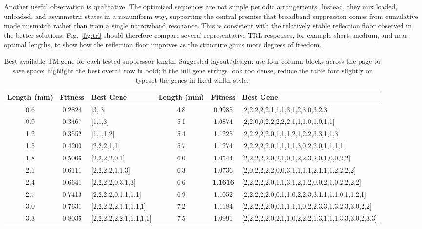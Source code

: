 \documentclass[journal]{IEEEtran}
\begin{document}
Another useful observation is qualitative. The optimized sequences are not simple periodic arrangements. Instead, they mix loaded, unloaded, and asymmetric states in a nonuniform way, supporting the central premise that broadband suppression comes from cumulative mode mismatch rather than from a single narrowband resonance. This is consistent with the relatively stable reflection floor observed in the better solutions. Fig.~\ref{fig:trl} should therefore compare several representative TRL responses, for example short, medium, and near-optimal lengths, to show how the reflection floor improves as the structure gains more degrees of freedom.

\begin{table}[t]
\centering
\caption{Best available TM gene for each tested suppressor length. Suggested layout/design: use four-column blocks across the page to save space; highlight the best overall row in bold; if the full gene strings look too dense, reduce the table font slightly or typeset the genes in fixed-width style.}
\label{tab:genes}
\begin{tabular}{c c p{2.6cm} c c p{2.6cm}}
\toprule
Length (mm) & Fitness & Best Gene & Length (mm) & Fitness & Best Gene \\
\midrule
0.6 & 0.2824 & [3, 3] & 4.8 & 0.9985 & [2,2,2,2,2,1,1,1,3,1,2,3,0,3,2,3] \\
0.9 & 0.3467 & [1,1,3] & 5.1 & 1.0874 & [2,2,0,0,2,2,2,2,2,1,1,1,0,1,0,1,1] \\
1.2 & 0.3552 & [1,1,1,2] & 5.4 & 1.1225 & [2,2,2,2,2,0,1,1,1,2,1,2,2,3,3,1,1,3] \\
1.5 & 0.4200 & [2,2,2,1,1] & 5.7 & 1.1274 & [2,2,2,2,2,0,1,1,1,1,3,0,2,2,0,1,1,1,1] \\
1.8 & 0.5006 & [2,2,2,2,0,1] & 6.0 & 1.0544 & [2,2,2,2,2,0,2,1,0,1,2,2,3,2,0,1,0,0,2,2] \\
2.1 & 0.6111 & [2,2,2,2,1,1,3] & 6.3 & 1.0736 & [2,0,2,2,2,2,0,0,3,1,1,1,1,2,1,1,1,2,2,2,2] \\
2.4 & 0.6641 & [2,2,2,2,0,3,1,3] & 6.6 & \textbf{1.1616} & [2,2,2,2,2,0,1,1,3,1,2,1,2,0,0,2,1,0,2,2,2,2] \\
2.7 & 0.7413 & [2,2,2,2,0,1,1,1,1] & 6.9 & 1.1052 & [2,2,2,2,2,0,0,1,1,0,2,2,3,3,1,1,1,1,0,1,1,2,1] \\
3.0 & 0.7631 & [2,2,2,2,2,1,1,1,1,1] & 7.2 & 1.1184 & [2,2,2,2,2,0,0,1,1,1,1,0,2,2,3,3,1,3,2,3,3,0,2,2] \\
3.3 & 0.8036 & [2,2,2,2,2,2,1,1,1,1,1] & 7.5 & 1.0991 & [2,2,2,2,2,0,2,1,1,0,2,2,2,1,3,1,1,1,3,3,3,0,2,3,3] \\

\end{tabular}
\end{table}
\end{document}
